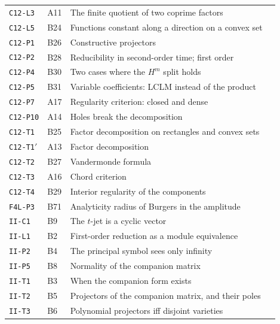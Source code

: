 \begin{center}
\begin{longtable}{@{}L{3.0cm}L{1.2cm}L{8.4cm}L{1.2cm}@{}}
\texttt{C12-L3} & A11 & The finite quotient of two coprime factors & \pageref{dim:C12-L3}\\
\texttt{C12-L5} & B24 & Functions constant along a direction on a convex set & \pageref{dim:C12-L5}\\
\texttt{C12-P1} & B26 & Constructive projectors & \pageref{dim:C12-P1}\\
\texttt{C12-P2} & B28 & Reducibility in second-order time; first order & \pageref{dim:C12-P2}\\
\texttt{C12-P4} & B30 & Two cases where the $H^m$ split holds & \pageref{dim:C12-P4}\\
\texttt{C12-P5} & B31 & Variable coefficients: LCLM instead of the product & \pageref{dim:C12-P5}\\
\texttt{C12-P7} & A17 & Regularity criterion: closed and dense & \pageref{dim:C12-P7}\\
\texttt{C12-P10} & A14 & Holes break the decomposition & \pageref{dim:C12-P10}\\
\texttt{C12-T1} & B25 & Factor decomposition on rectangles and convex sets & \pageref{dim:C12-T1}\\
\texttt{C12-T1$'$} & A13 & Factor decomposition & \pageref{dim:C12-T1'}\\
\texttt{C12-T2} & B27 & Vandermonde formula & \pageref{dim:C12-T2}\\
\texttt{C12-T3} & A16 & Chord criterion & \pageref{dim:C12-T3}\\
\texttt{C12-T4} & B29 & Interior regularity of the components & \pageref{dim:C12-T4}\\
\texttt{F4L-P3} & B71 & Analyticity radius of Burgers in the amplitude & \pageref{dim:F4L-P3}\\
\texttt{II-C1} & B9 & The $t$-jet is a cyclic vector & \pageref{dim:II-C1}\\
\texttt{II-L1} & B2 & First-order reduction as a module equivalence & \pageref{dim:II-L1}\\
\texttt{II-P2} & B4 & The principal symbol sees only infinity & \pageref{dim:II-P2}\\
\texttt{II-P5} & B8 & Normality of the companion matrix & \pageref{dim:II-P5}\\
\texttt{II-T1} & B3 & When the companion form exists & \pageref{dim:II-T1}\\
\texttt{II-T2} & B5 & Projectors of the companion matrix, and their poles & \pageref{dim:II-T2}\\
\texttt{II-T3} & B6 & Polynomial projectors iff disjoint varieties & \pageref{dim:II-T3}\\

\end{longtable}
\end{center}
